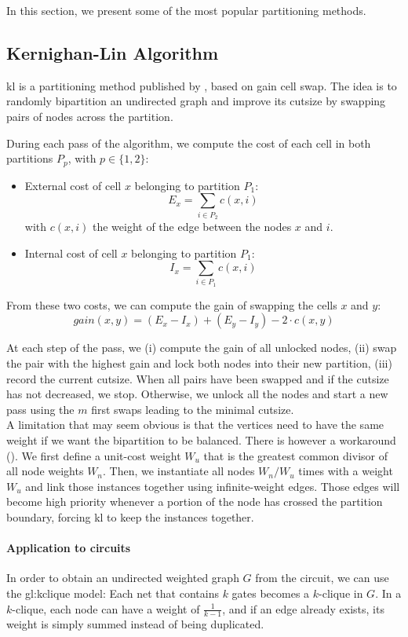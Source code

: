 \documentclass[11pt,a4paper]{report} %
\theoremstyle{customdef}
\begin{document}
In this section, we present some of the most popular partitioning methods.






\subsection{Kernighan-Lin Algorithm}
\gls{kl} is a partitioning method published by \citet{Kernighan1970}, based on gain cell swap.
The idea is to randomly bipartition an undirected graph and improve its cutsize by swapping pairs of nodes across the partition.

During each pass of the algorithm, we compute the cost of each cell in both partitions $P_p$, with $p \in \{1,2\}$:
\begin{itemize}
	\item External cost of cell $x$ belonging to partition $P_1$: \[E_x = \sum_{i \in P_2} c(x,i)\] with $c(x,i)$ the weight of the edge between the nodes $x$ and $i$.
	\item Internal cost of cell $x$ belonging to partition $P_1$: \[I_x = \sum_{i \in P_1} c(x,i)\]
\end{itemize}

From these two costs, we can compute the gain of swapping the cells $x$ and $y$:
\[gain(x,y) = (E_x - I_x) + (E_y - I_y) - 2 \cdot c(x,y)\]

At each step of the pass, we (i) compute the gain of all unlocked nodes, (ii) swap the pair with the highest gain and lock both nodes into their new partition, (iii) record the current cutsize.
When all pairs have been swapped and if the cutsize has not decreased, we stop. Otherwise, we unlock all the nodes and start a new pass using the $m$ first swaps leading to the minimal cutsize.\\

A limitation that may seem obvious is that the vertices need to have the same weight if we want the bipartition to be balanced.
There is however a workaround (\citet[p. 41]{KahngAndrewB.Lienig2011}). We first define a unit-cost weight $W_u$ that is the greatest common divisor of all node weights $W_n$.
Then, we instantiate all nodes $W_n/W_u$ times with a weight $W_u$ and link those instances together using infinite-weight edges.
Those edges will become high priority whenever a portion of the node has crossed the partition boundary, forcing \gls{kl} to keep the instances together.


\paragraph{Application to circuits}
In order to obtain an undirected weighted graph $G$ from the circuit, we can use the \gls{gl:kclique} model: Each net that contains $k$ gates becomes a $k$-clique in $G$.
In a $k$-clique, each node can have a weight of $\frac{1}{k-1}$, and if an edge already exists, its weight is simply summed instead of being duplicated.
\end{document}
